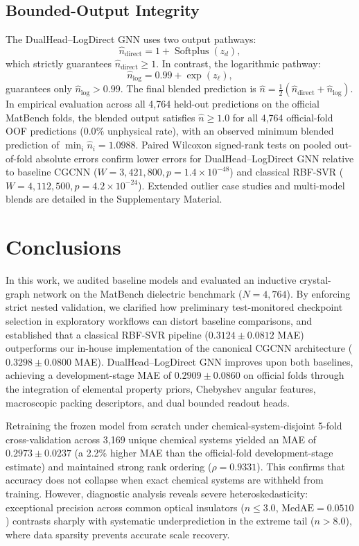 \documentclass[final,3p,times]{elsarticle}
\begin{document}
\subsection{Bounded-Output Integrity}
The DualHead--LogDirect GNN uses two output pathways:
\begin{equation}
    \hat{n}_{\mathrm{direct}} = 1 + \operatorname{Softplus}(z_d),
\end{equation}
which strictly guarantees $\hat{n}_{\mathrm{direct}} \ge 1$. In contrast, the logarithmic pathway:
\begin{equation}
    \hat{n}_{\log} = 0.99 + \exp(z_\ell),
\end{equation}
guarantees only $\hat{n}_{\log} > 0.99$. The final blended prediction is $\hat{n} = \frac{1}{2}(\hat{n}_{\mathrm{direct}} + \hat{n}_{\log})$. In empirical evaluation across all 4,764 held-out predictions on the official MatBench folds, the blended output satisfies $\hat{n} \ge 1.0$ for all 4,764 official-fold OOF predictions ($0.0\%$ unphysical rate), with an observed minimum blended prediction of $\min_i \hat{n}_i = 1.0988$. Paired Wilcoxon signed-rank tests \cite{wilcoxon1945individual} on pooled out-of-fold absolute errors confirm lower errors for DualHead--LogDirect GNN relative to baseline CGCNN ($W = 3{,}421{,}800, p = 1.4 \times 10^{-48}$) and classical RBF-SVR ($W = 4{,}112{,}500, p = 4.2 \times 10^{-24}$). Extended outlier case studies and multi-model blends are detailed in the Supplementary Material.

\section{Conclusions}
In this work, we audited baseline models and evaluated an inductive crystal-graph network on the MatBench dielectric benchmark ($N = 4{,}764$). By enforcing strict nested validation, we clarified how preliminary test-monitored checkpoint selection in exploratory workflows can distort baseline comparisons, and established that a classical RBF-SVR pipeline ($0.3124 \pm 0.0812$ MAE) outperforms our in-house implementation of the canonical CGCNN architecture ($0.3298 \pm 0.0800$ MAE). DualHead--LogDirect GNN improves upon both baselines, achieving a development-stage MAE of $0.2909 \pm 0.0860$ on official folds through the integration of elemental property priors, Chebyshev angular features, macroscopic packing descriptors, and dual bounded readout heads.

Retraining the frozen model from scratch under chemical-system-disjoint 5-fold cross-validation across 3,169 unique chemical systems yielded an MAE of $0.2973 \pm 0.0237$ (a 2.2\% higher MAE than the official-fold development-stage estimate) and maintained strong rank ordering ($\rho = 0.9331$). This confirms that accuracy does not collapse when exact chemical systems are withheld from training. However, diagnostic analysis reveals severe heteroskedasticity: exceptional precision across common optical insulators ($n \le 3.0$, $\text{MedAE} = 0.0510$) contrasts sharply with systematic underprediction in the extreme tail ($n > 8.0$), where data sparsity prevents accurate scale recovery.
\end{document}
